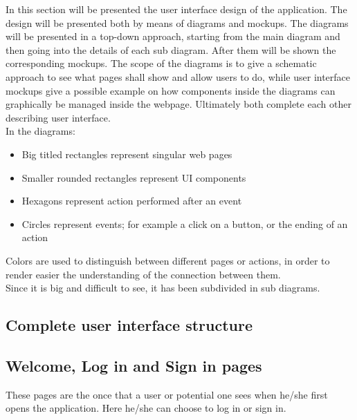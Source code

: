 
In this section will be presented the user interface design of the application. The design will be presented both by means of diagrams and mockups. The diagrams will be presented in a top-down approach, starting from the main diagram and then going into the details of each sub diagram. After them will be shown the corresponding mockups. The scope of the diagrams is to give a schematic approach to see what pages shall show and allow users to do, while user interface mockups give a possible example on how components inside the diagrams can graphically be managed inside the webpage. Ultimately both complete each other describing user interface.\\
In the diagrams:
\begin{itemize}
    \item Big titled rectangles represent singular web pages
    \item Smaller rounded rectangles represent UI components
    \item Hexagons represent action performed after an event
    \item Circles represent events; for example a click on a button, or the ending of an action
\end{itemize} 
Colors are used to distinguish between different pages or actions, in order to render easier the understanding of the connection between them.\\
Since it is big and difficult to see, it has been subdivided in sub diagrams.
\subsection{Complete user interface structure}
\clearpage
\subsection{Welcome, Log in and Sign in pages}
These pages are the once that a user or potential one sees when he/she first opens the application. Here he/she can choose to log in or sign in.\\
\clearpage
{}
\newpage
{} 
\clearpage
